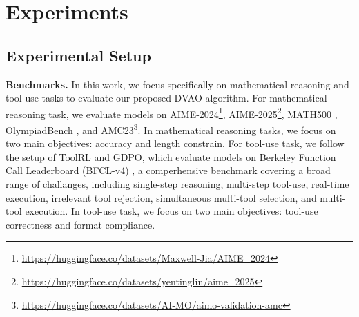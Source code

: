 \section{Experiments}

\subsection{Experimental Setup}
\textbf{Benchmarks.} In this work, we focus specifically on mathematical reasoning and tool-use tasks to evaluate our proposed DVAO algorithm. For mathematical reasoning task, we evaluate models on AIME-2024\footnote{\url{https://huggingface.co/datasets/Maxwell-Jia/AIME_2024}}, AIME-2025\footnote{\url{https://huggingface.co/datasets/yentinglin/aime_2025}}, MATH500 \citep{math500}, OlympiadBench \citep{olympiadbench}, and AMC23\footnote{\url{https://huggingface.co/datasets/AI-MO/aimo-validation-amc}}. In mathematical reasoning tasks, we focus on two main objectives: accuracy and length constrain. For tool-use task, we follow the setup of ToolRL \citep{toolrl} and GDPO, which evaluate models on Berkeley Function Call Leaderboard (BFCL-v4) \citep{bfcl}, a comperhensive benchmark covering a broad range of challanges, including single-step reasoning, multi-step tool-use, real-time execution, irrelevant tool rejection, simultaneous multi-tool selection, and multi-tool execution. In tool-use task, we focus on two main objectives: tool-use correctness and format compliance.

